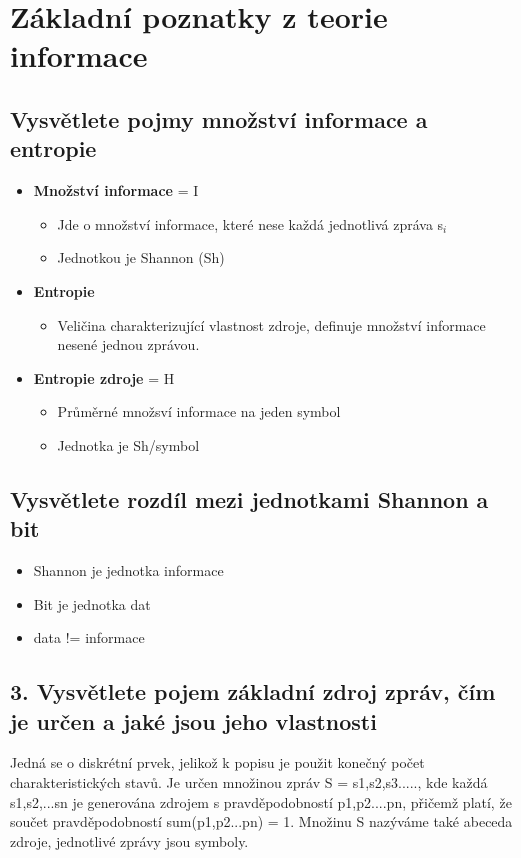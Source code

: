 \clearpage
\section{Základní poznatky z teorie informace}
\subsection{Vysvětlete pojmy množství informace a entropie}
\begin{itemize}
    \item \textbf{Množství informace} = I
    \begin{itemize}
        \item Jde o množství informace, které nese  každá jednotlivá zpráva s$_i$
        \item Jednotkou je Shannon (Sh)
    \end{itemize}
    \item \textbf{Entropie} 
    \begin{itemize}
        \item Veličina charakterizující vlastnost zdroje, definuje množství informace nesené jednou zprávou.
    \end{itemize}
    \item \textbf{Entropie zdroje} = H
    \begin{itemize}
        \item Průměrné množsví informace na jeden symbol
        \item Jednotka je Sh/symbol
    \end{itemize}
\end{itemize}

\subsection{ Vysvětlete rozdíl mezi jednotkami Shannon a bit}
\begin{itemize}
    \item Shannon je jednotka informace
    \item Bit je jednotka dat
    \item data != informace
\end{itemize}

\subsection{3.	Vysvětlete pojem základní zdroj zpráv, čím je určen a jaké jsou jeho vlastnosti}
Jedná se o diskrétní prvek, jelikož k popisu je použit konečný počet charakteristických stavů.
Je určen množinou zpráv S = {s1,s2,s3.....}, kde každá s1,s2,...sn je generována zdrojem s pravděpodobností p1,p2....pn, přičemž platí, že součet pravděpodobností sum(p1,p2...pn) = 1.
Množinu S nazýváme také abeceda zdroje, jednotlivé zprávy jsou symboly.

